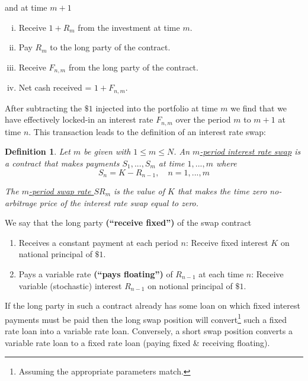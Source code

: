 \documentclass[12pt]{article}
\newtheorem{definition}{Definition}
\newlength\tindent
\renewcommand{\indent}{\hspace*{\tindent}}
\begin{document}
and at time $m + 1$
\begin{enumerate}[(i)]
	\item Receive $1 + R_m$ from the investment at time $m$.
	\item Pay $R_m$ to the long party of the contract.
	\item Receive $F_{n,m}$ from the long party of the contract.
	\item Net cash received = $1 + F_{n,m}$.
\end{enumerate}

\indent After subtracting the $\$1$ injected into the portfolio at time $m$ we find that we have effectively locked-in an interest rate $F_{n,m}$ over the period $m$ to $m + 1$ at time $n$. This transaction leads to the definition of an interest rate swap: \\

\begin{definition} Let $m$ be given with $1 \leq m \leq N$. An \underline{$m$-period interest rate swap} is a contract that makes payments $S_1,...,S_m$ at time $1,...,m$ where
\begin{equation*}
	S_n = K - R_{n - 1}, \quad n = 1,...,m
\end{equation*}

\indent The \underline{$m$-period swap rate $SR_m$} is the value of $K$ that makes the time zero no-arbitrage price of the interest rate swap equal to zero.
\end{definition}

We say that the long party {\bf (``receive fixed'')} of the swap contract 
\begin{enumerate}
	\item Receives a constant payment at each period $n$: Receive fixed interest $K$ on national principal of $\$1$.
	\item Pays a variable rate {\bf (``pays floating'')} of $R_{n - 1}$ at each time $n$: Receive variable (stochastic) interest $R_{n - 1}$ on notional principal of $\$1$.
\end{enumerate}

\indent If the long party in such a contract already has some loan on which fixed interest payments must be paid then the long swap position will convert\footnote{Assuming the appropriate parameters match.} such a fixed rate loan into a variable rate loan. Conversely, a short swap position converts a variable rate loan to a fixed rate loan (paying fixed \& receiving floating).
\end{document}
